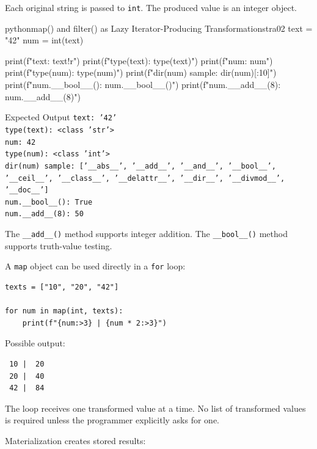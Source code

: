 \documentclass[a4paper,twoside]{report}
\begin{document}
Each original string is passed to \texttt{int}. The produced value is an integer object.

\begin{codebox}[]{python}{map() and filter() as Lazy Iterator-Producing Transformations}{tra02}
text = "42"
num = int(text)

print(f"text: {text!r}")
print(f"type(text): {type(text)}")
print(f"num: {num}")
print(f"type(num): {type(num)}")
print(f"dir(num) sample: {dir(num)[:10]}")
print(f"num.__bool__(): {num.__bool__()}")
print(f"num.__add__(8): {num.__add__(8)}")
\end{codebox}


\begin{iobox}{Expected Output}
\texttt{text: '42'} \\
\texttt{type(text): <class 'str'>} \\
\texttt{num: 42} \\
\texttt{type(num): <class 'int'>} \\
\texttt{dir(num) sample: ['\_\_abs\_\_', '\_\_add\_\_', '\_\_and\_\_', '\_\_bool\_\_',} \\
\texttt{'\_\_ceil\_\_', '\_\_class\_\_', '\_\_delattr\_\_', '\_\_dir\_\_', '\_\_divmod\_\_',} \\
\texttt{'\_\_doc\_\_']} \\
\texttt{num.\_\_bool\_\_(): True} \\
\texttt{num.\_\_add\_\_(8): 50} \\
\end{iobox}


The \texttt{\_\_add\_\_()} method supports integer addition. The \texttt{\_\_bool\_\_()} method supports truth-value testing.

A \texttt{map} object can be used directly in a \texttt{for} loop:

\begin{verbatim}
texts = ["10", "20", "42"]

for num in map(int, texts):
    print(f"{num:>3} | {num * 2:>3}")
\end{verbatim}

Possible output:

\begin{verbatim}
 10 |  20
 20 |  40
 42 |  84
\end{verbatim}

The loop receives one transformed value at a time. No list of transformed values is required unless the programmer explicitly asks for one.

Materialization creates stored results:
\end{document}
